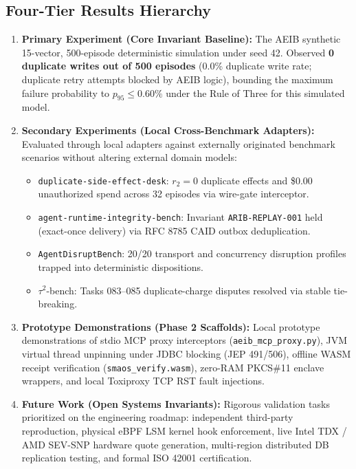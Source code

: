 \documentclass[10pt,journal,compsoc]{IEEEtran}
\begin{document}
\subsection{Four-Tier Results Hierarchy}
\begin{enumerate}
    \item \textbf{Primary Experiment (Core Invariant Baseline):} The AEIB synthetic 15-vector, 500-episode deterministic simulation under seed 42. Observed \textbf{0 duplicate writes out of 500 episodes} (0.0\% duplicate write rate; duplicate retry attempts blocked by AEIB logic), bounding the maximum failure probability to $p_{95} \le 0.60\%$ under the Rule of Three for this simulated model.
    \item \textbf{Secondary Experiments (Local Cross-Benchmark Adapters):} Evaluated through local adapters against externally originated benchmark scenarios without altering external domain models:
    \begin{itemize}
        \item \texttt{duplicate-side-effect-desk}: $r_2 = 0$ duplicate effects and \$0.00 unauthorized spend across 32 episodes via wire-gate interceptor.
        \item \texttt{agent-runtime-integrity-bench}: Invariant \texttt{ARIB-REPLAY-001} held (exact-once delivery) via RFC 8785 CAID outbox deduplication.
        \item \texttt{AgentDisruptBench}: 20/20 transport and concurrency disruption profiles trapped into deterministic dispositions.
        \item $\tau^2$-bench: Tasks 083--085 duplicate-charge disputes resolved via stable tie-breaking.
    \end{itemize}
    \item \textbf{Prototype Demonstrations (Phase 2 Scaffolds):} Local prototype demonstrations of stdio MCP proxy interceptors (\texttt{aeib\_mcp\_proxy.py}), JVM virtual thread unpinning under JDBC blocking (JEP 491/506), offline WASM receipt verification (\texttt{smaos\_verify.wasm}), zero-RAM PKCS\#11 enclave wrappers, and local Toxiproxy TCP RST fault injections.
    \item \textbf{Future Work (Open Systems Invariants):} Rigorous validation tasks prioritized on the engineering roadmap: independent third-party reproduction, physical eBPF LSM kernel hook enforcement, live Intel TDX / AMD SEV-SNP hardware quote generation, multi-region distributed DB replication testing, and formal ISO 42001 certification.
\end{enumerate}
\end{document}
